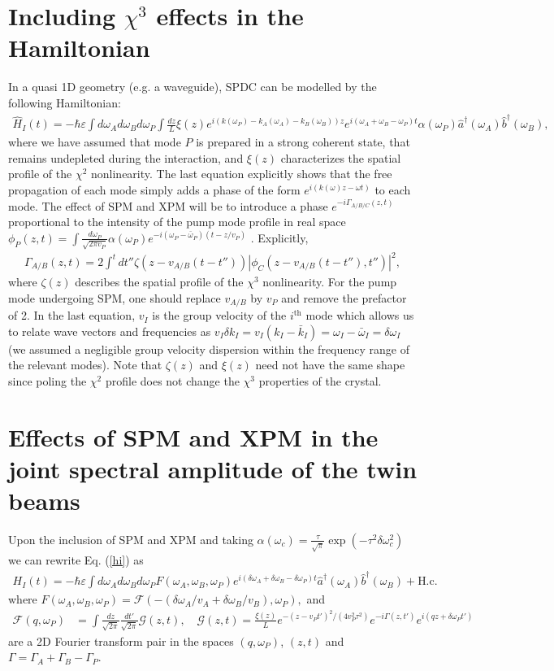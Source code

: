 \documentclass[letterpaper,10pt]{article}
\newcommand{\hc}{\text{H.c.}}
\newcommand{\h}{\hat}
\newcommand{\eq}[1]{\begin{align}#1\end{align}}
\begin{document}
\section{Including $\chi^3$ effects in the Hamiltonian}
In a quasi 1D geometry  (e.g. a waveguide), SPDC can be modelled by the following Hamiltonian:
\eq{\label{hi}
\h H_I(t)=-\hbar \varepsilon \int d\omega _A d\omega
_B d\omega _P \int \frac{dz}{L} \xi(z) e^{i(k(\omega _P)-k_A(\omega
_A)-k_B(\omega _B)) z}  e^{i (\omega_A+\omega_B-\omega_P) t} \alpha(\omega_P) \h a^{\dagger }(\omega_A) \h b^{\dagger }(\omega _B),
}
where we have assumed that mode $P$ is prepared in a strong coherent state, that remains undepleted during the interaction, and $\xi(z)$ characterizes the spatial profile of the $\chi^2$ nonlinearity. The last equation explicitly shows that the free propagation of each mode simply adds a phase of the form $e^{i (k(\omega) z-\omega t)}$ to each mode. The effect of SPM and XPM will be to introduce a phase $e^{-i\Gamma_{A/B/C}(z,t)}$ proportional to the intensity of the pump mode profile in real space $\phi_P(z,t)=\int \frac{d\omega_P}{\sqrt{2 \pi v_P}} \alpha(\omega_P) e^{-i (\omega_P- \bar \omega_P)(t-z/v_P)}$
. Explicitly, 
\eq{
\Gamma_{A/B}(z,t)=2 \int^t dt''\zeta(z-v_{A/B} (t-t'')) |\phi_C(z-v_{A/B}(t-t''),t'')|^2,
}
where $\zeta(z)$ describes the spatial profile of the $\chi^3$ nonlinearity. For the pump mode undergoing SPM, one should replace $v_{A/B}$ by $v_P$ and remove the prefactor of 2. In the last equation, $v_I$ is the group velocity of the $i^{\text{th}}$ mode which allows us to relate wave vectors and frequencies as $v_I \delta k_I=v_I(k_I-\bar k_I)=\omega_I-\bar \omega_I=\delta \omega_I$ (we assumed a negligible group velocity dispersion within the frequency range of the relevant modes). Note that $\zeta(z)$ and $\xi(z)$ need not have the same shape since poling the $\chi^2$ profile does not change the $\chi^3$ properties of the crystal.

\section{Effects of SPM and XPM in the joint spectral amplitude of the twin beams}
Upon the inclusion of SPM and XPM and taking $\alpha(\omega_c)=\frac{\tau}{\sqrt{\pi}} \exp(-\tau^2 \delta \omega_c^2)$ we can rewrite Eq. (\ref{hi}) as
\eq{
H_I(t)=-\hbar \varepsilon\int d\omega_A d\omega_B d\omega_P F(\omega_A,\omega_B,\omega_P) e^{i(\delta \omega_A +\delta \omega_B - \delta \omega_P)t}\h a^\dagger(\omega_A) \h b^\dagger(\omega_B)+\hc
}
where $F(\omega_A,\omega_B,\omega_P)=\mathcal{F}\left(-(\delta \omega_A/v_A+\delta \omega_B/v_B),\omega_P\right),$  and
\eq{\label{F}
\mathcal{F}(q,\omega_P)&=\int \frac{dz}{\sqrt{2 \pi}} \frac{dt'}{\sqrt{2 \pi}} \mathcal{G}(z,t), \quad  \mathcal{G}(z,t)= \frac{\xi(z)}{L}  e^{-(z-v_P t')^2/(4 v_P^2 \tau^2)} e^{-i \Gamma(z,t')}e^{i (q z + \delta \omega_P t')}
}
are a 2D Fourier transform pair in the spaces $(q,\omega_P)$,  $(z,t)$ and $\Gamma=\Gamma_A+\Gamma_B-\Gamma_P$.
\end{document}
